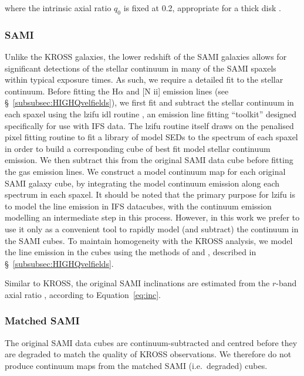 \documentclass[a4paper,fleqn,usenatbib]{mnras}
\begin{document}
{\noindent where the intrinsic axial ratio $q_{0}$ is fixed at 0.2, appropriate for a thick disk \citep[e.g.][]{Guthrie:1992,Law:2012,Weijmans:2014}.


\subsubsection{SAMI}
\label{subsubsec:HQcontmaps}

Unlike the KROSS galaxies, the lower redshift of the SAMI galaxies allows for significant detections of the stellar continuum in many of the SAMI spaxels within typical exposure times. As such, we require a detailed fit to the stellar continuum. Before fitting the H$\alpha$ and [N {\sc ii}] emission lines (see \S~\ref{subsubsec:HIGHQvelfields}), we first fit and subtract the stellar continuum in each spaxel using the {\sc lzifu} {\sc idl} routine \citep{Ho:2016}, an emission line fitting ``toolkit'' designed specifically for use with IFS data. The {\sc lzifu} routine itself draws on the penalised pixel fitting routine \citep[{\sc pPXF};][]{Cappellari:2004,Cappellari:2017} to fit a library of model SEDs to the spectrum of each spaxel in order to build a corresponding cube of best fit model stellar continuum emission. We then subtract this from the original SAMI data cube before fitting the gas emission lines. We construct a model continuum map for each original SAMI galaxy cube, by integrating the model continuum emission along each spectrum in each spaxel. It should be noted that the primary purpose for {\sc lzifu} is to model the line emission in IFS datacubes, with the continuum emission modelling an intermediate step in this process. However, in this work we prefer to use it only as a convenient tool to rapidly model (and subtract) the continuum in the SAMI cubes. To maintain homogeneity with the KROSS analysis, we model the line emission in the cubes using the methods of \citet{Swinbank:2006} and \citet{Stott:2016}, described in \S~\ref{subsubsec:HIGHQvelfields}.   

Similar to KROSS, the original SAMI inclinations are estimated from the $r$-band axial ratio \citep{Cortese:2016}, according to Equation~\ref{eq:inc}.

\subsubsection{Matched SAMI}

The original SAMI data cubes are continuum-subtracted and centred before they are degraded to match the quality of KROSS observations. We therefore do not produce continuum maps from the matched SAMI (i.e.\ degraded) cubes.

}
\end{document}
